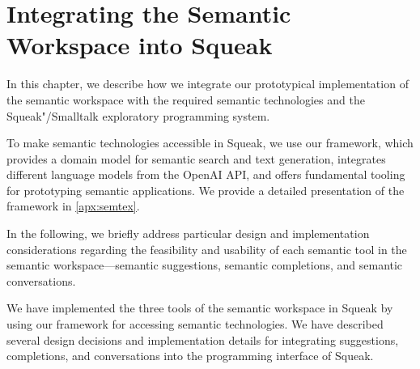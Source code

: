 
\chapter{Integrating the Semantic Workspace into Squeak}
\label{cha:implementation}

In this chapter, we describe how we integrate our prototypical implementation of the semantic workspace with the required semantic technologies and the Squeak"/Smalltalk exploratory programming system.

To make semantic technologies accessible in Squeak, we use our \semtex framework, which provides a domain model for semantic search and text generation, integrates different language models from the OpenAI API, and offers fundamental tooling for prototyping semantic applications.
We provide a detailed presentation of the framework in \cref{apx:semtex}.

In the following, we briefly address particular design and implementation considerations regarding the feasibility and usability of each semantic tool in the semantic workspace---semantic suggestions, semantic completions, and semantic conversations.


\begin{summary}
	We have implemented the three tools of the semantic workspace in Squeak by using our \semtex framework for accessing semantic technologies.
	We have described several design decisions and implementation details for integrating suggestions, completions, and conversations into the programming interface of Squeak.
\end{summary}
